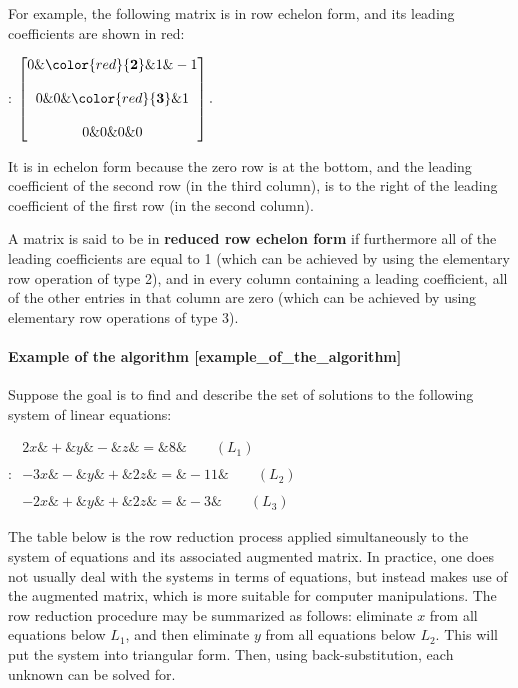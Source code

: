 For example, the following matrix is in row echelon form, and its
leading coefficients are shown in red:

:   $\begin{bmatrix}
      0 \& \color{red}{\mathbf{2}} \&                     1   \& -1 \\\\
            0 \&                     0   \& \color{red}{\mathbf{3}} \&  1 \\\\
            0 \&                     0   \&                     0   \&  0
    \end{bmatrix}.$

It is in echelon form because the zero row is at the bottom, and the
leading coefficient of the second row (in the third column), is to the
right of the leading coefficient of the first row (in the second
column).

A matrix is said to be in \textbf{reduced row echelon form} if furthermore
all of the leading coefficients are equal to 1 (which can be achieved by
using the elementary row operation of type 2), and in every column
containing a leading coefficient, all of the other entries in that
column are zero (which can be achieved by using elementary row
operations of type 3).

\paragraph{Example of the algorithm [example\_of\_the\_algorithm]}

Suppose the goal is to find and describe the set of solutions to the
following system of linear equations:

:   $\begin{alignedat}{4}
      2x \&{}+{}\& y \&{}-{}\&  z \&{}={}\&   8 \& \qquad (L_1) \\\\
           -3x \&{}-{}\& y \&{}+{}\& 2z \&{}={}\& -11 \& \qquad (L_2) \\\\
           -2x \&{}+{}\& y \&{}+{}\& 2z \&{}={}\&  -3 \& \qquad (L_3)
    \end{alignedat}$

The table below is the row reduction process applied simultaneously to
the system of equations and its associated augmented matrix. In
practice, one does not usually deal with the systems in terms of
equations, but instead makes use of the augmented matrix, which is more
suitable for computer manipulations. The row reduction procedure may be
summarized as follows: eliminate $x$ from all
equations below $L_1$, and then
eliminate $y$ from all equations below
$L_2$. This will put the system into
triangular form. Then, using back-substitution, each unknown can be
solved for.

